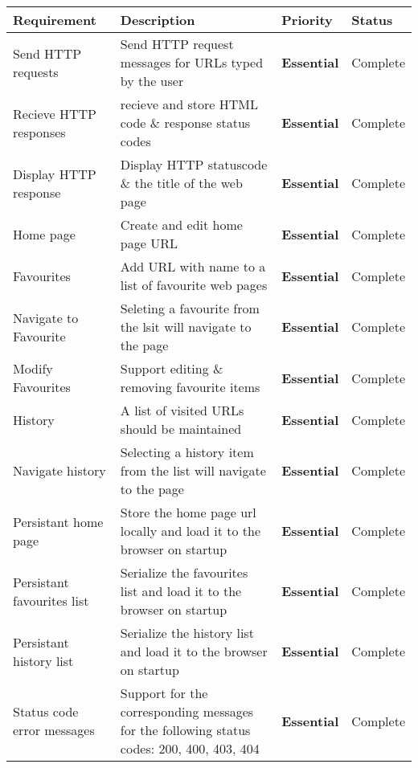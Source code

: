 \documentclass[../Main.tex]{subfiles}
\begin{document}
\begin{center}
    \begin{longtable}{|p{3cm}|p{7cm}|l|p{2cm}|}
        \hline
        \textbf{Requirement} & \textbf{Description} & \textbf{Priority} & \textbf{Status}\\
        \hline \endhead
        Send HTTP requests & Send HTTP request messages for URLs typed by the user & \textbf{Essential} & Complete\\
        \hline 
        Recieve HTTP responses & recieve and store HTML code \& response status codes & \textbf{Essential} & Complete \\
        \hline
        Display HTTP response & Display HTTP statuscode \& the title of the web page & \textbf{Essential} & Complete\\
        \hline
        Home page & Create and edit home page URL & \textbf{Essential} & Complete \\
        \hline
        Favourites & Add URL with name to a list of favourite web pages & \textbf{Essential} & Complete \\
        \hline
        Navigate to Favourite & Seleting a favourite from the lsit will navigate to the page & \textbf{Essential} & Complete\\
        \hline
        Modify Favourites & Support editing \& removing favourite items & \textbf{Essential} & Complete \\
        \hline
        History & A list of visited URLs should be maintained & \textbf{Essential} & Complete\\
        \hline
        Navigate history & Selecting a history item from the list will navigate to the page & \textbf{Essential} & Complete\\
        \hline
        Persistant home page & Store the home page url locally and load it to the browser on startup & \textbf{Essential} & Complete \\
        \hline
        Persistant favourites list & Serialize the favourites list and load it to the browser on startup & \textbf{Essential} & Complete \\
        \hline
        Persistant history list & Serialize the history list and load it to the browser on startup & \textbf{Essential} & Complete \\
        \hline
        Status code error messages & Support for the corresponding messages for the following status codes: 200, 400, 403, 404 & \textbf{Essential} & Complete \\
        \hline

\end{longtable}
\end{center}
\end{document}
